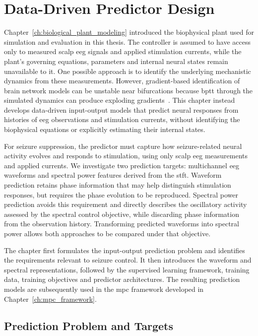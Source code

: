 
\chapter{Data-Driven Predictor Design}\label{ch:data_driven_predictor_design}
Chapter~\ref{ch:biological_plant_modeling} introduced the biophysical plant used for simulation and evaluation in this thesis.
The controller is assumed to have access only to measured scalp \ac{eeg} signals and applied stimulation currents, while the plant's governing equations, parameters and internal neural states remain unavailable to it.
One possible approach is to identify the underlying mechanistic dynamics from these measurements.
However, gradient-based identification of brain network models can be unstable near bifurcations because \ac{bptt} through the simulated dynamics can produce exploding gradients~\cite{Pille2025}.
This chapter instead develops data-driven input-output models that predict neural responses from histories of \ac{eeg} observations and stimulation currents, without identifying the biophysical equations or explicitly estimating their internal states.

For seizure suppression, the predictor must capture how seizure-related neural activity evolves and responds to stimulation, using only scalp \ac{eeg} measurements and applied currents.
We investigate two prediction targets: multichannel \ac{eeg} waveforms and spectral power features derived from the \ac{stft}.
Waveform prediction retains phase information that may help distinguish stimulation responses, but requires the phase evolution to be reproduced.
Spectral power prediction avoids this requirement and directly describes the oscillatory activity assessed by the spectral control objective, while discarding phase information from the observation history.
Transforming predicted waveforms into spectral power allows both approaches to be compared under that objective.

The chapter first formulates the input-output prediction problem and identifies the requirements relevant to seizure control.
It then introduces the waveform and spectral representations, followed by the supervised learning framework, training data, training objectives and predictor architectures.
The resulting prediction models are subsequently used in the \ac{mpc} framework developed in Chapter~\ref{ch:mpc_framework}.



\section{Prediction Problem and Targets}\label{sec:prediction_problem}

